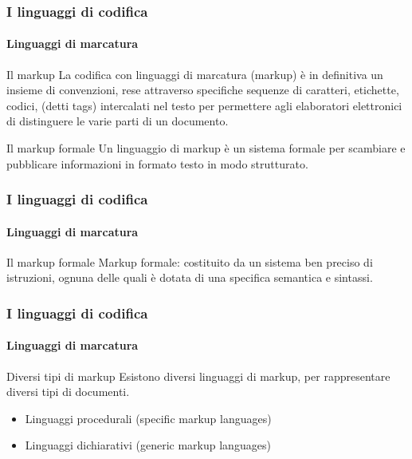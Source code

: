 \documentclass{beamer}
\begin{document}
\begin{frame}
	\frametitle{I linguaggi di codifica}
	\framesubtitle{Linguaggi di marcatura}
	\addtocounter{nframe}{1}

	\begin{block}{Il markup}
		La codifica con linguaggi di marcatura (markup) è in definitiva un insieme di convenzioni, rese attraverso specifiche sequenze di caratteri, etichette, codici, (detti tags) intercalati nel testo per permettere agli elaboratori elettronici di distinguere le varie parti di un documento.
	\end{block}

	\begin{block}{Il markup formale}
		Un linguaggio di markup è un sistema formale per scambiare e pubblicare informazioni in formato testo in modo strutturato.
	\end{block}


\end{frame}

\begin{frame}
	\frametitle{I linguaggi di codifica}
	\framesubtitle{Linguaggi di marcatura}
	\addtocounter{nframe}{1}

	\begin{block}{Il markup formale}
		Markup formale: costituito da un sistema ben preciso di istruzioni, ognuna delle quali è dotata di una specifica semantica e sintassi.
	\end{block}


\end{frame}

\begin{frame}
	\frametitle{I linguaggi di codifica}
	\framesubtitle{Linguaggi di marcatura}
	\addtocounter{nframe}{1}

	\begin{block}{Diversi tipi di markup}
		Esistono diversi linguaggi di markup, per rappresentare diversi tipi di documenti.
		\begin{itemize}
			\item Linguaggi procedurali (specific markup languages)
			\item Linguaggi dichiarativi (generic markup languages)
		\end{itemize}
	\end{block}
\end{frame}
\end{document}
